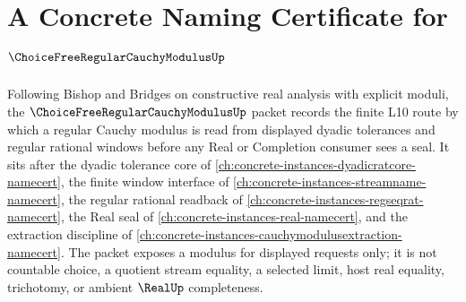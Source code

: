 \chapter{A Concrete Naming Certificate for $\ChoiceFreeRegularCauchyModulusUp$}
\label{ch:concrete-instances-choice-free-regular-cauchy-modulus-namecert}

Following Bishop and Bridges on constructive real analysis with explicit moduli, the $\ChoiceFreeRegularCauchyModulusUp$ packet records the finite L10 route by which a regular Cauchy modulus is read from displayed dyadic tolerances and regular rational windows before any Real or Completion consumer sees a seal. It sits after the dyadic tolerance core of \autoref{ch:concrete-instances-dyadicratcore-namecert}, the finite window interface of \autoref{ch:concrete-instances-streamname-namecert}, the regular rational readback of \autoref{ch:concrete-instances-regseqrat-namecert}, the Real seal of \autoref{ch:concrete-instances-real-namecert}, and the extraction discipline of \autoref{ch:concrete-instances-cauchymodulusextraction-namecert}. The packet exposes a modulus for displayed requests only; it is not countable choice, a quotient stream equality, a selected limit, host real equality, trichotomy, or ambient $\RealUp$ completeness.

